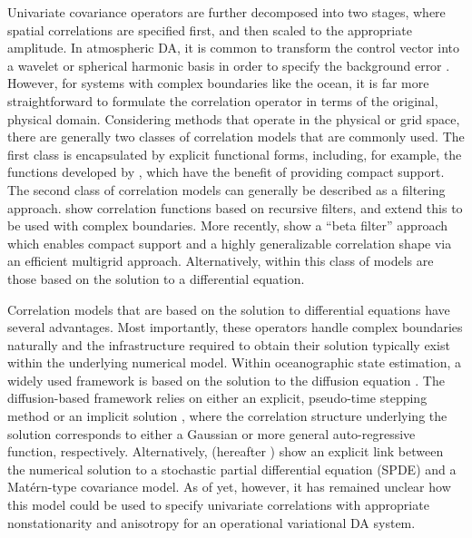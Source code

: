 \documentclass[alpha-refs]{wiley-article}
\begin{document}
Univariate covariance operators are further decomposed into two stages, where spatial
correlations are specified first, and then scaled to the appropriate amplitude.
In atmospheric DA, it is common to transform the control vector
into a wavelet or spherical harmonic basis in order to specify the background
error \citep[e.g.,][]{bannister_review_2008-2}.
However, for systems with complex boundaries like the ocean, it is far more
straightforward to formulate the correlation operator in terms of the original,
physical domain.
Considering methods that operate in the physical or grid space, there are
generally two classes of correlation models that are commonly used.
The first class is encapsulated by explicit functional forms, including, for
example, the functions developed by
\citet{gaspari_construction_1999,gneiting_correlation_1999,gaspari_construction_2006},
which have the benefit of providing compact support.
The second class of correlation models can generally be described as a filtering
approach.
\citet{purser_numerical_2003-2,purser_numerical_2003-1}
show correlation functions based on recursive filters, and
\citet{dobricic_oceanographic_2008} extend this to be used with complex boundaries.
More recently, \citet{purser_multigrid_2022} show a ``beta
filter'' approach which enables compact support and a highly generalizable
correlation shape via an efficient multigrid approach.
Alternatively, within this class of models are those based on the solution to a
differential equation.

Correlation models that are based on the solution to differential equations have
several advantages.
Most importantly, these operators handle complex boundaries naturally and the
infrastructure required to obtain their solution typically exist within
the underlying numerical model.
Within oceanographic state estimation, a widely used framework is based on the
solution to the diffusion equation
\citep[e.g.,][]{nguyen_arctic_2021,forgetECCOv4,blockley_recent_2014,moore_regional_2011-1,daget_ensemble_2009,muccino_inverse_2008,di_lorenzo_weak_2007,weaver_three-_2003}.
The diffusion-based framework relies on either an explicit, pseudo-time stepping
method \citep{weaver_correlation_2001} or an implicit solution
\citep{mirouze_representation_2010,carrier_background-error_2010,weaver_diffusion_2013},
where the correlation structure underlying the solution corresponds to either a
Gaussian or more general auto-regressive function, respectively.
Alternatively, \citet{RSSB:RSSB777} (hereafter )
show an explicit link between the numerical solution
to a stochastic partial differential equation (SPDE) and a Mat\'ern-type covariance
model.
As of yet, however, it has remained unclear how this model could be used to
specify univariate correlations with appropriate nonstationarity and anisotropy
for an operational variational DA system.
\end{document}
